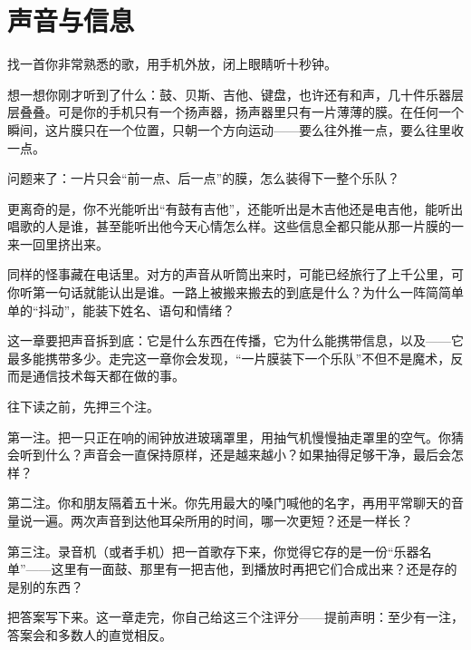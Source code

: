 \chapter{声音与信息}


\begin{mainline}
找一首你非常熟悉的歌，用手机外放，闭上眼睛听十秒钟。

想一想你刚才听到了什么：鼓、贝斯、吉他、键盘，也许还有和声，几十件乐器层层叠叠。可是你的手机只有一个扬声器，扬声器里只有一片薄薄的膜。在任何一个瞬间，这片膜只在一个位置，只朝一个方向运动——要么往外推一点，要么往里收一点。

问题来了：一片只会“前一点、后一点”的膜，怎么装得下一整个乐队？

更离奇的是，你不光能听出“有鼓有吉他”，还能听出是木吉他还是电吉他，能听出唱歌的人是谁，甚至能听出他今天心情怎么样。这些信息全都只能从那一片膜的一来一回里挤出来。

同样的怪事藏在电话里。对方的声音从听筒出来时，可能已经旅行了上千公里，可你听第一句话就能认出是谁。一路上被搬来搬去的到底是什么？为什么一阵简简单单的“抖动”，能装下姓名、语句和情绪？

这一章要把声音拆到底：它是什么东西在传播，它为什么能携带信息，以及——它最多能携带多少。走完这一章你会发现，“一片膜装下一个乐队”不但不是魔术，反而是通信技术每天都在做的事。
\end{mainline}


\begin{mainline}
往下读之前，先押三个注。

第一注。把一只正在响的闹钟放进玻璃罩里，用抽气机慢慢抽走罩里的空气。你猜会听到什么？声音会一直保持原样，还是越来越小？如果抽得足够干净，最后会怎样？

第二注。你和朋友隔着五十米。你先用最大的嗓门喊他的名字，再用平常聊天的音量说一遍。两次声音到达他耳朵所用的时间，哪一次更短？还是一样长？

第三注。录音机（或者手机）把一首歌存下来，你觉得它存的是一份“乐器名单”——这里有一面鼓、那里有一把吉他，到播放时再把它们合成出来？还是存的是别的东西？

把答案写下来。这一章走完，你自己给这三个注评分——提前声明：至少有一注，答案会和多数人的直觉相反。
\end{mainline}


